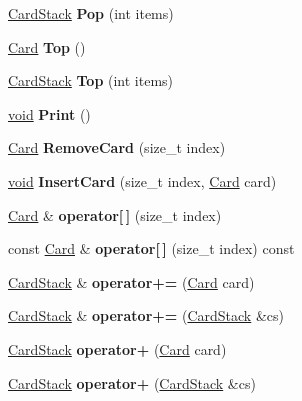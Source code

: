 \begin{DoxyCompactItemize}
\hyperlink{class_card_stack}{Card\+Stack} {\bfseries Pop} (int items)
\item 
\mbox{\label{class_card_stack_a1e2f09c7534b40f7a785520000b4fe26}} 
\hyperlink{class_card}{Card} {\bfseries Top} ()
\item 
\mbox{\label{class_card_stack_a04560ae98b63762f6addc4dbf9894cab}} 
\hyperlink{class_card_stack}{Card\+Stack} {\bfseries Top} (int items)
\item 
\mbox{\label{class_card_stack_a4f8eb49803bcf0fd017ad21552eb241a}} 
\hyperlink{interfacevoid}{void} {\bfseries Print} ()
\item 
\mbox{\label{class_card_stack_ab9f0268f8bdadc44d0e931fc34c31cae}} 
\hyperlink{class_card}{Card} {\bfseries Remove\+Card} (size\+\_\+t index)
\item 
\mbox{\label{class_card_stack_a9c3edd5fd9baa46df2df9c651b63ba18}} 
\hyperlink{interfacevoid}{void} {\bfseries Insert\+Card} (size\+\_\+t index, \hyperlink{class_card}{Card} card)
\item 
\mbox{\label{class_card_stack_adcb30293c4f0ae45966bc026a0b6203a}} 
\hyperlink{class_card}{Card} \& {\bfseries operator\mbox{[}$\,$\mbox{]}} (size\+\_\+t index)
\item 
\mbox{\label{class_card_stack_a4c00060a60f5f199819c59b42738254f}} 
const \hyperlink{class_card}{Card} \& {\bfseries operator\mbox{[}$\,$\mbox{]}} (size\+\_\+t index) const
\item 
\mbox{\label{class_card_stack_a998d1de718365a020e5f78fc00aafb84}} 
\hyperlink{class_card_stack}{Card\+Stack} \& {\bfseries operator+=} (\hyperlink{class_card}{Card} card)
\item 
\mbox{\label{class_card_stack_a4c9ff16acc699d2c438d520e3fde417b}} 
\hyperlink{class_card_stack}{Card\+Stack} \& {\bfseries operator+=} (\hyperlink{class_card_stack}{Card\+Stack} \&cs)
\item 
\mbox{\label{class_card_stack_a339bf5cea376c4da4d00b2115c6bbaf7}} 
\hyperlink{class_card_stack}{Card\+Stack} {\bfseries operator+} (\hyperlink{class_card}{Card} card)
\item 
\mbox{\label{class_card_stack_aec3ba1d3ce326e65b6df73ea92a25edc}} 
\hyperlink{class_card_stack}{Card\+Stack} {\bfseries operator+} (\hyperlink{class_card_stack}{Card\+Stack} \&cs)
\end{DoxyCompactItemize}
